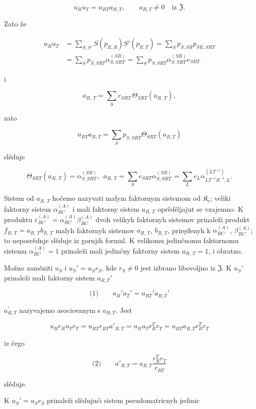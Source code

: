 \documentclass[11pt]{article}
\begin{document}
\[
u_Ru_T=u_{RT}a_{R,T},\qquad a_{R,T}\ne0\quad\text{iz }\mathfrak Z.
\]

Zato že

\[
\begin{aligned}
u_Ru_T
&=\sum_{S,S'} S(p_{E,R})S'(p_{E,T})
=\sum_S p_{S,SR}p_{SR,SRT}\\
&=\sum_S p_{S,SRT}\alpha_{S,SRT}^{(SR)}
=\sum_S p_{S,SRT}\alpha_{S,SRT}^{(SR)}e_{SRT}
\end{aligned}
\]

i

\[a_{R,\,T} = \sum\limits_{S} e_{SRT}\, \Theta_{SRT} \left(a_{R,\,T}\right),\]

zato

\[u_{RT} a_{R,T} = \sum\limits_{S} p_{S,SRT} \Theta_{SRT} (a_{R,T})\]

slěduje

\[\Theta_{SRT}(a_{R,\,T}) = \alpha_{S,SRT}^{(SR)}, ~~ a_{R,\,T} = \sum\limits_{S} e_{SRT} \alpha_{S,SRT}^{(SR)} = \sum\limits_{L} e_{L} \alpha_{LT^{-1}R^{-1},L}^{(LT^{-1})}.\]

Sistem od \(a_{R,\,T}\) hočemo nazyvati malym faktornym sistemom od \(\mathfrak K_r\); veliki faktorny sistem \(\alpha_{BC}^{(A)}\) i mali faktorny sistem \(a_{R,\,T}\) oprěděljajut se vzajemno. K produktu \(\varepsilon_{BC}^{(A)} = \alpha_{BC}^{(A)} \beta_{BC}^{(A)}\) dvoh velikyh faktornyh sistemov prinaleži produkt \(f_{R,\,T} = a_{R,\,T}b_{R,\,T}\) malyh faktornyh sistemov \(a_{R,\,T}\), \(b_{R,\,T}\), priręđenyh k \(\alpha_{BC}^{(A)}\), \(\beta_{BC}^{(A)}\); to neposrědnje slěduje iz gornjih formul. K velikomu jedinčnomu faktornomu sistemu \(\alpha_{BC}^{(A)} = 1\) prinaleži mali jedinčny faktorny sistem \(a_{R,\,T} = 1\), i obratno.

Možno zaměniti \(u_S\) i \(u_S'=u_Sr_S\), kde \(r_S\neq 0\) jest izbrano libovoljno iz \(\mathfrak Z\). K \(u_S'\) prinaleži mali faktorny sistem \(a_{R,T}'\)

\[
\text{(1)}\qquad u_R'u_T'=u_{RT}'a_{R,T}'
\]

\(a_{R,T}^{\prime}\) nazyvajemo asociovanym s \(a_{R,T}\). Jest

\[u_R r_R u_T r_T = u_{RT} r_{RT} a'_{R,T} = u_R u_T r_R^T r_T = u_{RT} a_{R,T} r_R^T r_T\]

iz čego

\[
\text{(2)}\qquad a'_{R,T}=a_{R,T}\frac{r_R^T r_T}{r_{RT}}
\]

slěduje.

K \(u_S' = u_S r_S\) prinaleži slědujući sistem pseudomatricnyh jedinic
\end{document}
